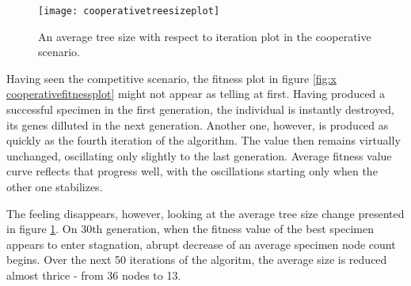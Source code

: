 \begin{figure}[h]
    \centering
    \texttt{[image: cooperativetreesizeplot]}
    \caption{An average tree size with respect to iteration plot in the cooperative scenario.}
    \label{fig:x cooperativetreesizeplot}
\end{figure}

Having seen the competitive scenario, the fitness plot in figure \ref{fig:x cooperativefitnessplot} might not appear as telling at first. Having produced a successful specimen in the first generation, the individual is instantly destroyed, its genes dilluted in the next generation. Another one, however, is produced as quickly as the fourth iteration of the algorithm. The value then remains virtually unchanged, oscillating only slightly to the last generation. Average fitness value curve reflects that progress well, with the oscillations starting only when the other one stabilizes.

The feeling disappears, however, looking at the average tree size change presented in figure \ref{fig:x cooperativetreesizeplot}. On 30th generation, when the fitness value of the best specimen appears to enter stagnation, abrupt decrease of an average specimen node count begins. Over the next 50 iterations of the algoritm, the average size is reduced almost thrice - from 36 nodes to 13.
